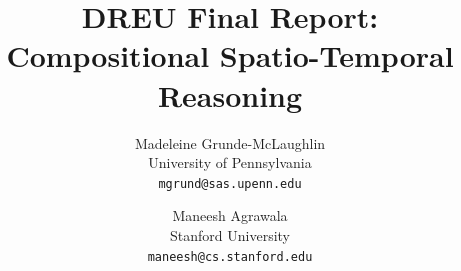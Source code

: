 \documentclass[10pt,twocolumn,letterpaper]{article}
\begin{document}
\title{DREU Final Report: Compositional Spatio-Temporal Reasoning}

\author{Madeleine Grunde-McLaughlin\\
University of Pennsylvania\\
{\tt\small mgrund@sas.upenn.edu}
\and
Maneesh Agrawala\\
Stanford University\\
{\tt\small maneesh@cs.stanford.edu}
}

\maketitle
\pagestyle{empty}
\end{document}
